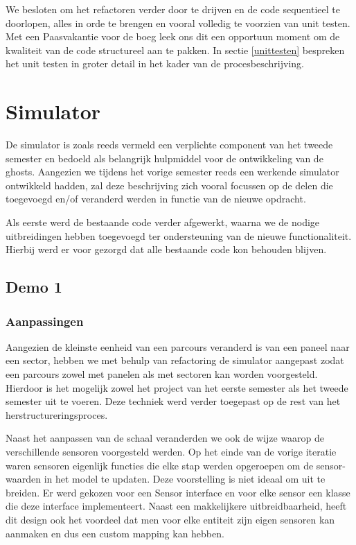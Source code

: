 \documentclass[12pt,a4paper]{report}
\begin{document}
We besloten om het refactoren verder door te drijven en de code sequentieel te doorlopen, alles in orde te brengen en vooral volledig te voorzien van unit testen. Met een Paasvakantie voor de boeg leek ons dit een opportuun moment om de kwaliteit van de code structureel aan te pakken.
In sectie \ref{unittesten} bespreken het unit testen in groter detail in het kader van de procesbeschrijving.

\chapter{Simulator}

De simulator is zoals reeds vermeld een verplichte component van het tweede semester en bedoeld als belangrijk hulpmiddel voor de ontwikkeling van de ghosts. Aangezien we tijdens het vorige semester reeds een werkende simulator ontwikkeld hadden, zal deze beschrijving zich vooral focussen op de delen die toegevoegd en/of veranderd werden in functie van de nieuwe opdracht.

Als eerste werd de bestaande code verder afgewerkt, waarna we de nodige uitbreidingen hebben toegevoegd ter ondersteuning van de nieuwe functionaliteit. Hierbij werd er voor gezorgd dat alle bestaande code kon behouden blijven.

\section{Demo 1}

\subsection{Aanpassingen}

Aangezien de kleinste eenheid van een parcours veranderd is van een paneel naar een sector, hebben we met behulp van refactoring de simulator aangepast zodat een parcours zowel met panelen als met sectoren kan worden voorgesteld. Hierdoor is het mogelijk zowel het project van het eerste semester als het tweede semester uit te voeren. Deze techniek werd verder toegepast op de rest van het herstructureringsproces. 

Naast het aanpassen van de schaal veranderden we ook de wijze waarop de verschillende sensoren voorgesteld werden. Op het einde van de vorige iteratie waren sensoren eigenlijk functies die elke stap werden opgeroepen om de sensor-waarden in het model te updaten. Deze voorstelling is niet ideaal om uit te breiden. Er werd gekozen voor een Sensor interface en voor elke sensor een klasse die deze interface implementeert. Naast een makkelijkere uitbreidbaarheid, heeft dit design ook het voordeel dat men voor elke entiteit zijn eigen sensoren kan aanmaken en dus een custom mapping kan hebben.
\end{document}
